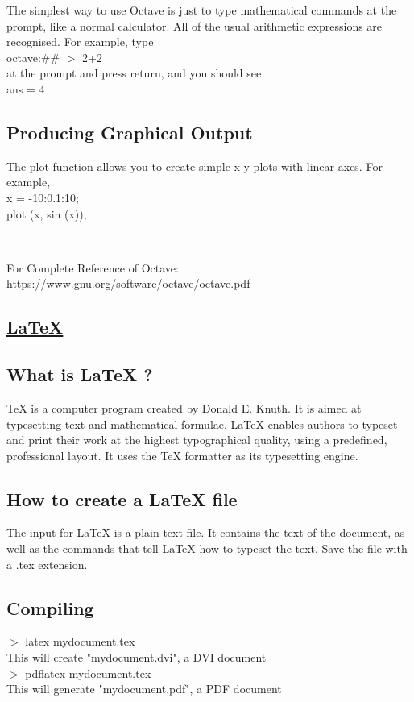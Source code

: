 \documentclass[a4paper, 12pt]{article}
\begin{document}
The simplest way to use Octave is just to type mathematical commands at the prompt,
like a normal calculator.  All of the usual arithmetic expressions are recognised.  For
example, type \\
octave:\#\# $>$ 2+2 \\
at the prompt and press return, and you should see \\
ans = 4

\subsection{Producing Graphical Output}
The plot function allows you to create simple x-y plots with linear axes. For example,\\
x = -10:0.1:10; \\
plot (x, sin (x));

\

For Complete Reference of Octave:
https://www.gnu.org/software/octave/octave.pdf

\begin{center}
\section{\underline{\LaTeX{}}}
\end{center}

\subsection{What is \LaTeX{} ?}
\TeX{} is a computer program created by Donald E. Knuth. It is aimed at typesetting text and mathematical formulae. \LaTeX{} enables authors to typeset and print their work at the highest typographical quality, using a predefined, professional layout. It uses the \TeX{} formatter as its typesetting engine.

\subsection{How to create a \LaTeX{} file}
The input for \LaTeX{} is a plain text file. It contains the text of the document, as well as the commands that tell \LaTeX{} how to typeset the text. Save the file with a .tex extension.

\subsection{Compiling}
$>$ latex mydocument.tex \\
This will create "mydocument.dvi", a DVI document \\
$>$ pdflatex mydocument.tex \\
This will generate "mydocument.pdf", a PDF document
\end{document}
